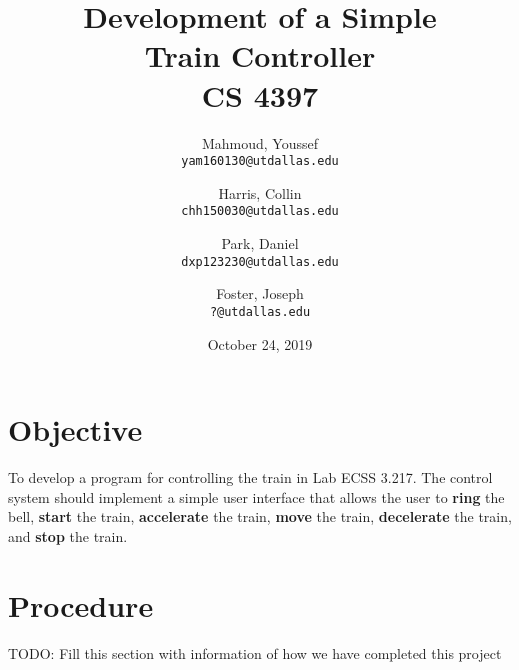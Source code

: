 \documentclass{article}
\author{
	Mahmoud, Youssef\\
	\texttt{yam160130@utdallas.edu}
	\and
	Harris, Collin\\
	\texttt{chh150030@utdallas.edu}
	\and
	Park, Daniel\\
	\texttt{dxp123230@utdallas.edu}
	\and
	Foster, Joseph\\
	\texttt{?@utdallas.edu} %
}
\date{October 24, 2019}
\title{
  \textbf{
    Development of a Simple \\ Train Controller \\ CS 4397
  }
}
\begin{document}
  \maketitle

  \section{Objective}
    To develop a program for controlling the train in Lab ECSS 3.217. The control system
		should implement a simple user interface that allows the user to \textbf{ring} the
		bell, \textbf{start} the train, \textbf{accelerate} the train, \textbf{move} the
		train, \textbf{decelerate} the train, and \textbf{stop} the train.

  \section{Procedure}
	  TODO: Fill this section with information of how we have completed this project
\end{document}
